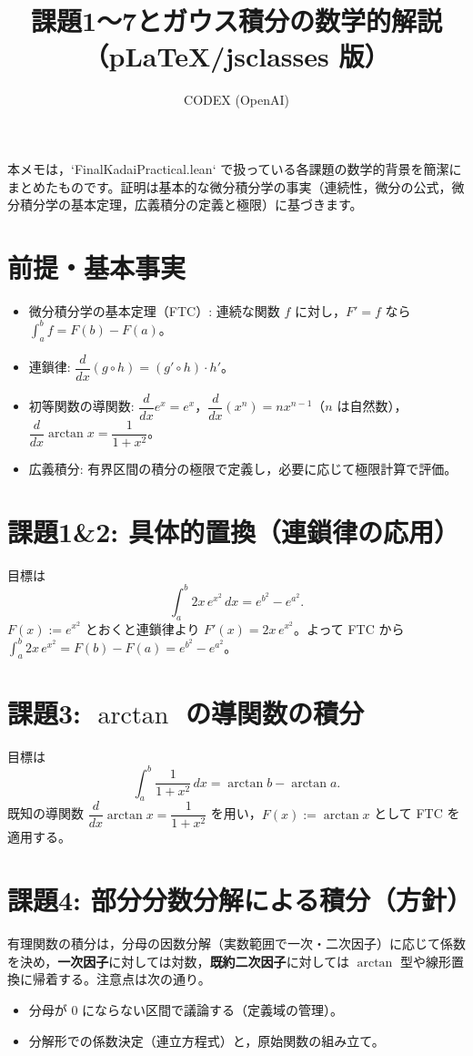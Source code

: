 \documentclass[a4paper,12pt]{jsarticle}
\title{課題1〜7とガウス積分の数学的解説（p\LaTeX/jsclasses 版）}
\author{CODEX (OpenAI)}
\date{}
\begin{document}
\maketitle

本メモは，`FinalKadaiPractical.lean` で扱っている各課題の数学的背景を簡潔にまとめたものです。証明は基本的な微分積分学の事実（連続性，微分の公式，微分積分学の基本定理，広義積分の定義と極限）に基づきます。

\section*{前提・基本事実}
\begin{itemize}
  \item 微分積分学の基本定理（FTC）: 連続な関数 $f$ に対し，$F' = f$ なら $\int_a^b f = F(b) - F(a)$。
  \item 連鎖律: $\dfrac{d}{dx}(g\circ h) = (g'\circ h)\cdot h'$。
  \item 初等関数の導関数: $\dfrac{d}{dx} e^{x} = e^{x}$，$\dfrac{d}{dx} (x^n) = n x^{n-1}$（$n$ は自然数），$\dfrac{d}{dx}\arctan x = \dfrac{1}{1+x^2}$。
  \item 広義積分: 有界区間の積分の極限で定義し，必要に応じて極限計算で評価。
\end{itemize}

\section{課題1\&2: 具体的置換（連鎖律の応用）}
目標は
\[
  \int_a^b 2x\, e^{x^2}\,dx = e^{b^2} - e^{a^2}.
\]
$F(x) := e^{x^2}$ とおくと連鎖律より $F'(x) = 2x\, e^{x^2}$。よって FTC から $\int_a^b 2x\, e^{x^2} = F(b) - F(a) = e^{b^2} - e^{a^2}$。

\section{課題3: $\arctan$ の導関数の積分}
目標は
\[
  \int_a^b \frac{1}{1+x^2}\,dx = \arctan b - \arctan a.
\]
既知の導関数 $\dfrac{d}{dx}\arctan x = \dfrac{1}{1+x^2}$ を用い，$F(x) := \arctan x$ として FTC を適用する。

\section{課題4: 部分分数分解による積分（方針）}
有理関数の積分は，分母の因数分解（実数範囲で一次・二次因子）に応じて係数を決め，\textbf{一次因子}に対しては対数，\textbf{既約二次因子}に対しては $\arctan$ 型や線形置換に帰着する。注意点は次の通り。
\begin{itemize}
  \item 分母が 0 にならない区間で議論する（定義域の管理）。
  \item 分解形での係数決定（連立方程式）と，原始関数の組み立て。
\end{itemize}
\end{document}
